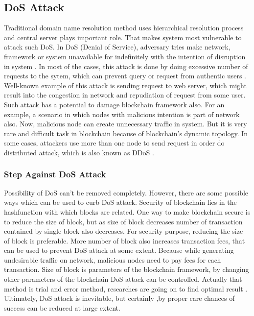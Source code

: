 \documentclass[a4paper,twoside,12pt]{report}
\begin{document}
\begin{spacing}{1.5}
\subsection{DoS Attack}
Traditional domain name resolution method uses hierarchical resolution process and central server plays important role. That makes system most vulnerable to attack such DoS. In DoS (Denial of Service), adversary tries make network, framework or system unavailable for indefinitely with the intention of disruption in system \cite{chao-yang_dos_2011}. In most of the cases, this attack is done by doing excessive number of requests to the sytem, which can prevent query or request from authentic users \cite{dos_wireless_singh_denial_2017}. Well-known example of this attack is sending request to web server, which might result into the congestion in network and repudiation of request from some user. Such attack has a potential to damage blockchain framework also. For an example, a scenario in which nodes with malicious intention is part of network also. Now, malicious node can create unnecessary traffic in system. But it is very rare and difficult task in blockchain because of blockchain's dynamic topology\cite{zaghloul_beginners_2018}. In some cases, attackers use more than one node to send request in order do distributed attack, which is also known as DDoS \cite{saad_exploring_2019}. 
\subsubsection{Step Against DoS Attack}
Possibility of DoS can't be removed completely. However, there are some possible ways which can be used to curb DoS attack. Security of blockchain lies in the hashfunction with which blocks are related. One way to make blockchain secure is to reduce the size of block, but as size of block decreases number of transaction contained by single block also decreases. For security purpose, reducing the size of block is preferable. More number of block also increases transaction fees, that can be used to prevent DoS attack at some extent. Because while generating undesirable traffic on network, malicious nodes need to pay fees for each transaction. Size of block is parameters of the blockchain framework, by changing other parameters of the blockchain DoS attack can be controlled. Actually that method is trial and error method, researches are going on to find optimal result \cite{zaghloul_beginners_2018}. Ultimately, DoS attack is inevitable, but certainly ,by proper care chances of success can be reduced at large extent.       

\end{spacing}
\end{document}
